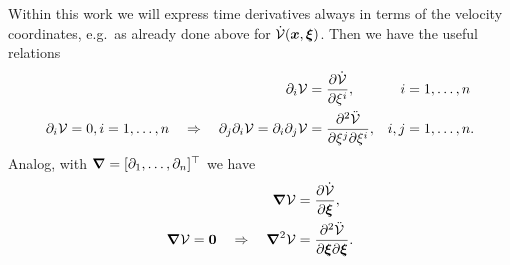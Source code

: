 Within this work we will express time derivatives always in terms of the velocity coordinates, e.g.\ as already done above for $\dot{\potentialEnergy}(\sysCoord, \sysVel)$.
Then we have the useful relations
\begin{subequations}
\begin{align}
 \dirDiff{\LidxI} \potentialEnergy &= \pdiff[\dot{\potentialEnergy}]{\sysVelCoeff{\LidxI}},&
 \LidxI &= 1,\ldots,\dimConfigSpace
\\
 \dirDiff{\LidxI} \potentialEnergy = 0, i=1,\ldots,\dimConfigSpace 
\quad \Rightarrow  \quad
 \dirDiff{\LidxII} \dirDiff{\LidxI} \potentialEnergy = \dirDiff{\LidxI} \dirDiff{\LidxII} \potentialEnergy &= \frac{\partial^2 \ddot{\potentialEnergy}}{\partial \sysVelCoeff{\LidxII} \partial \sysVelCoeff{\LidxI}},&
 \LidxI, \LidxII &= 1,\ldots,\dimConfigSpace
 .
\end{align}
\end{subequations}
Analog, with $\differential = [\dirDiff{1}, \ldots ,\dirDiff{\dimConfigSpace}]^\top$ we have
\begin{subequations}
\begin{align}
 \differential \potentialEnergy &= \pdiff[\dot{\potentialEnergy}]{\sysVel},
\\
 \differential \potentialEnergy = \tuple{0} 
\quad \Rightarrow  \quad
 \differential^2 \potentialEnergy &= \frac{\partial^2 \ddot{\potentialEnergy}}{\partial \sysVel \partial \sysVel}
 .
\end{align}
\end{subequations}


